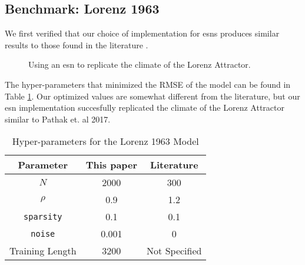 \subsection{Benchmark: Lorenz 1963}

We first verified that our choice of implementation for \glspl{esn}
produces similar results to those found in the literature \cite{pathak_using_2017}.
\begin{figure*}[t]
  
  \caption{Using an \gls{esn} to replicate the climate of the Lorenz Attractor.}
  \label{fig:lorenz63}
\end{figure*}
The hyper-parameters that minimized the RMSE of the model can be found in Table
\ref{tab:lorenzparam}. Our optimized values are somewhat different from the literature, but our \gls{esn} implementation succesfully
replicated the climate of the Lorenz Attractor similar to Pathak et. al 2017.
\begin{table}[ht]
  \centering
  \caption{Hyper-parameters for the Lorenz 1963 Model}
  \label{tab:lorenzparam}
  \begin{tabular}{c|c|c}
    \hline
    Parameter & This paper & Literature \cite{pathak_using_2017}\\
    \hline
    $N$ & 2000& 300\\
    $\rho$& 0.9&1.2\\
    \texttt{sparsity}& 0.1& 0.1\\
    \texttt{noise}& 0.001& 0\\
    Training Length & 3200& Not Specified\\
  \end{tabular}
\end{table}
